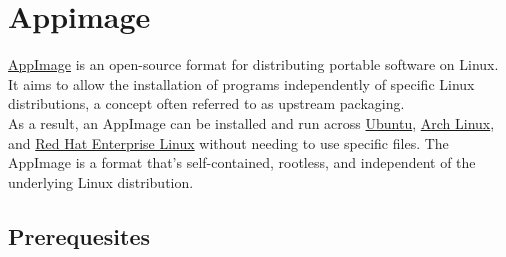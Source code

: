 \section{Appimage}

\href{https://appimage.org/}{AppImage} is an open-source format for distributing portable software on Linux.  
It aims to allow the installation of programs independently of specific Linux distributions, a concept often referred to as upstream packaging. \\
As a result, an AppImage can be installed and run across \href{https://ubuntu.com}{Ubuntu}, \href{https://archlinux.org}{Arch Linux}, and \href{https://www.redhat.com}{Red Hat Enterprise Linux} without needing to use specific files. 
The AppImage is a format that's self-contained, rootless, and independent of the underlying Linux distribution. 

\subsection{Prerequesites}

